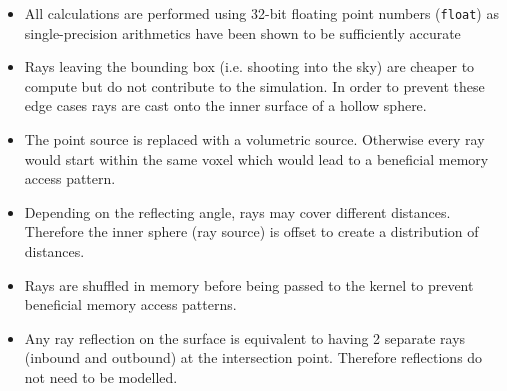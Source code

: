 \begin{itemize}
	\item All calculations are performed using 32-bit floating point numbers (\texttt{float}) as single-precision arithmetics have been shown to be sufficiently accurate \cite[Chapter 5.1]{manstetten2018efficient}
	\item Rays leaving the bounding box (i.e. shooting into the sky) are cheaper to compute but do not contribute to the simulation.
	      In order to prevent these edge cases rays are cast onto the inner surface of a hollow sphere.
	\item The point source is replaced with a volumetric source. Otherwise every ray would start within the same voxel which would lead to a beneficial memory access pattern.
	\item Depending on the reflecting angle, rays may cover different distances. Therefore the inner sphere (ray source) is offset to create a distribution of distances.
	\item Rays are shuffled in memory before being passed to the kernel to prevent beneficial memory access patterns.
	\item Any ray reflection on the surface is equivalent to having 2 separate rays (inbound and outbound) at the intersection point. Therefore reflections do not need to be modelled.
\end{itemize}


